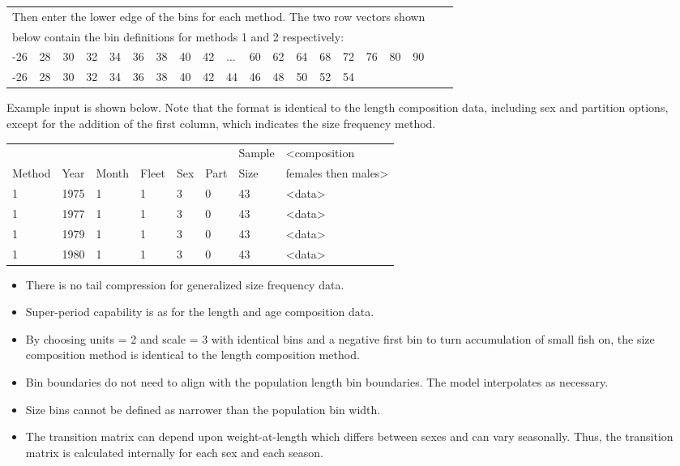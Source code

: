 \begin{center}
	\begin{tabular}{p{0.4cm} p{0.4cm} p{0.4cm} p{0.4cm} p{0.4cm} p{0.4cm} p{0.5cm} p{0.5cm} p{0.5cm} p{0.5cm} p{0.5cm} p{0.5cm} p{0.5cm} p{0.5cm} p{0.5cm} p{0.5cm} p{0.5cm} p{0.5cm} p{0.5cm} p{0.25cm}}
		\multicolumn{18}{l}{Then enter the lower edge of the bins for each method. The two row vectors shown} \\
		\multicolumn{18}{l}{below contain the bin definitions for methods 1 and 2 respectively:} \\
		\hline
		-26 & 28 & 30 & 32 & 34 & 36 & 38 & 40 & 42 & ... & 60 & 62 & 64 & 68 & 72 & 76 & 80 & 90 \Tstrut\\
		-26 & 28 & 30 & 32 & 34 & 36 & 38 & 40 & 42 &  44 & 46 & 48 & 50 & 52 & \multicolumn{4}{l}{54} \Bstrut\\
		\hline 
	\end{tabular}
\end{center}

Example input is shown below. Note that the format is identical to the length composition data, including sex and partition options, except for the addition of the first column, which indicates the size frequency method.

\begin{center}
	\begin{tabular}{p{1.5cm} p{1cm} p{1cm} p{1cm} p{1cm} p{1cm} p{1.5cm} p{5cm}}
		\hline
		& & & & & & Sample & <composition \Tstrut\\
		Method & Year & Month & Fleet & Sex & Part & Size & females then males> \Bstrut\\
		\hline
		1 & 1975 & 1 & 1 & 3 & 0 & 43 & <data> \Tstrut\\
		1 & 1977 & 1 & 1 & 3 & 0 & 43 & <data> \\
		1 & 1979 & 1 & 1 & 3 & 0 & 43 & <data> \\
		1 & 1980 & 1 & 1 & 3 & 0 & 43 & <data> \Bstrut\\
		\hline
	\end{tabular}
\end{center}

\begin{itemize}
	\item There is no tail compression for generalized size frequency data.
	\item Super-period capability is as for the length and age composition data.
	\item By choosing units = 2 and scale = 3 with identical bins and a negative first bin to turn accumulation of small fish on, the size composition method is identical to the length composition method.
	\item Bin boundaries do not need to align with the population length bin boundaries. The model interpolates as necessary.
	\item Size bins cannot be defined as narrower than the population bin width.
	\item The transition matrix can depend upon weight-at-length which differs between sexes and can vary seasonally. Thus, the transition matrix is calculated internally for each sex and each season.
\end{itemize}

